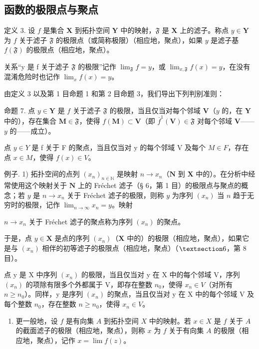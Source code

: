 \subsection{函数的极限点与聚点}

定义 3. 设 \(f\) 是集合 \(\mathbf{X}\) 到拓扑空间 \(\mathbf{Y}\) 中的映射，\(\mathfrak{F}\) 是 \(\mathbf{X}\) 上的滤子。称点 \(y \in \mathbf{Y}\) 为 \(f\) 关于滤子 \(\mathfrak{F}\) 的极限点（或简称极限）（相应地，聚点），如果 \(y\) 是滤子基 \(f(\mathfrak{F})\) 的极限点（相应地，聚点）。

关系“y 是 f 关于滤子 \(\mathfrak{F}\) 的极限”记作 \(\lim_{\mathfrak{F}} f = y\)，或 \(\lim_{x, \mathfrak{F}} f(x) = y\)，在没有混淆危险时也记作 \(\lim_{x} f(x) = y\)。

由定义 3 以及第 1 目命题 1 和第 2 目命题 3，我们导出下列判别准则：

命题 7. 点 \(y \in \mathbf{Y}\) 是 \(f\) 关于滤子 \(\mathfrak{F}\) 的极限，当且仅当对每个邻域 \(\mathbf{V}\)（\(y\) 的，在 \(\mathbf{Y}\) 中的），存在集合 \(\mathbf{M} \in \mathfrak{F}\)，使得 \(f(\mathbf{M}) \subset \mathbf{V}\)（即 \(\overline{f}^{1}(\mathbf{V}) \in \mathfrak{F}\) 对每个邻域 \(\mathbf{V}\)——\(y\) 的——成立）。

点 \(y \in Y\) 是 f 关于 F 的聚点，当且仅当对 y 的每个邻域 V 及每个 \(M \in F\)，存在点 \(x \in M\)，使得 \(f(x) \in V\)。

例子. 1) 拓扑空间的点列 \((x_{n})_{n\in \mathbb{N}}\) 是映射 \(n\to x_n\)（\(\mathbf{N}\) 到 \(\mathbf{X}\) 中的）。在分析中经常使用这个映射关于 \(\mathbf{N}\) 上的 Fréchet 滤子（§ 6，第 1 目）的极限点与聚点的概念；若 \(y\) 是 \(n\to x_{n}\) 关于 Fréchet 滤子的极限，则称 \(y\) 为序列 \((x_{n})\) 当 \(n\) 趋于无穷时的极限，记作 \(\lim_{n\to \infty}x_n = y\)。映射

\(n \to x_{n}\) 关于 Fréchet 滤子的聚点称为序列 \((x_{n})\) 的聚点。

于是，点 \(y \in \mathbf{X}\) 是点的序列 \((x_n)\)（\(\mathbf{X}\) 中的）的极限（相应地，聚点），如果它是与 \((x_n)\) 相伴的初等滤子的极限点（相应地，聚点）（\(\S 6\)，第 8 目）。

点 y 是 X 中序列 \((x_{n})\) 的极限，当且仅当对 y 在 X 中的每个邻域 V，序列 \((x_{n})\) 的项除有限多个外都属于 V，即存在整数 \(n_{0}\)，使得 \(x_{n} \in V\)（对所有 \(n \geqslant n_{0}\)）。同样，y 是序列 \((x_{n})\) 的聚点，当且仅当对 y 在 X 中的每个邻域 V 及每个整数 \(n_{0}\)，存在整数 \(n \geqslant n_{0}\)，使得 \(x_{n} \in V\)。

\begin{enumerate}
\def\labelenumi{\arabic{enumi})}
\setcounter{enumi}{1}
\tightlist
\item
  更一般地，设 \(f\) 是有向集 \(A\) 到拓扑空间 \(X\) 中的映射。若 \(x \in X\) 是 \(f\) 关于 \(A\) 的截面滤子的极限（相应地，聚点），则称 \(x\) 为 \(f\) 关于有向集 \(A\) 的极限（相应地，聚点），记作 \(x = \lim f(z)\)。
\end{enumerate}

